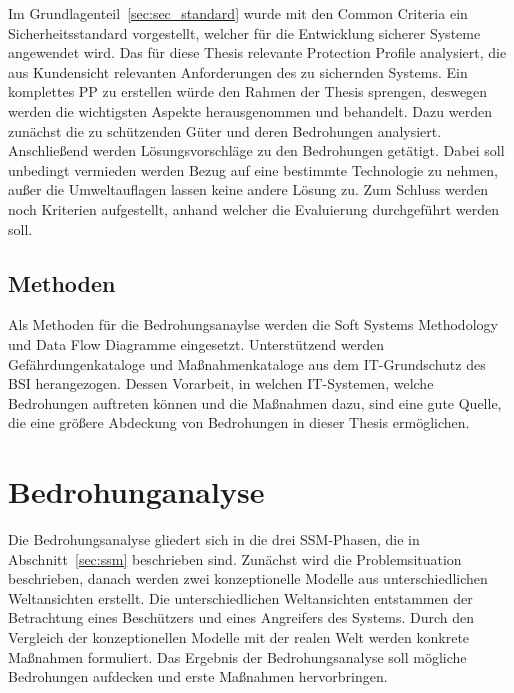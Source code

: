 \documentclass[11pt,a4paper]{report}
\begin{document}
Im Grundlagenteil~\ref{sec:sec_standard} wurde mit den Common Criteria ein Sicherheitsstandard vorgestellt, welcher für die Entwicklung sicherer Systeme angewendet wird. Das für diese Thesis relevante Protection Profile analysiert, die aus Kundensicht relevanten Anforderungen des zu sichernden Systems. Ein komplettes PP zu erstellen würde den Rahmen der Thesis sprengen, deswegen werden die wichtigsten Aspekte herausgenommen und behandelt. Dazu werden zunächst die zu schützenden Güter und deren Bedrohungen analysiert. Anschließend werden Lösungsvorschläge zu den Bedrohungen getätigt. Dabei soll unbedingt vermieden werden Bezug auf eine bestimmte Technologie zu nehmen, außer die Umweltauflagen lassen keine andere Lösung zu. Zum Schluss werden noch Kriterien aufgestellt, anhand welcher die Evaluierung durchgeführt werden soll.

\section{Methoden}

Als Methoden für die Bedrohungsanaylse werden die Soft Systems Methodology und Data Flow Diagramme eingesetzt. Unterstützend werden Gefährdungenkataloge und Maßnahmenkataloge aus dem IT-Grundschutz des BSI herangezogen. Dessen Vorarbeit, in welchen IT-Systemen, welche Bedrohungen auftreten können und die Maßnahmen dazu, sind eine gute Quelle, die eine größere Abdeckung von Bedrohungen in dieser Thesis ermöglichen.

\chapter{Bedrohunganalyse} \label{chap:threat_analysis}

Die Bedrohungsanalyse gliedert sich in die drei SSM-Phasen, die in Abschnitt~\ref{sec:ssm} beschrieben sind. Zunächst wird die Problemsituation beschrieben, danach werden zwei konzeptionelle Modelle aus unterschiedlichen Weltansichten erstellt. Die unterschiedlichen Weltansichten entstammen der Betrachtung eines Beschützers und eines Angreifers des Systems. Durch den Vergleich der konzeptionellen Modelle mit der realen Welt werden konkrete Maßnahmen formuliert. Das Ergebnis der Bedrohungsanalyse soll mögliche Bedrohungen aufdecken und erste Maßnahmen hervorbringen.
\end{document}
